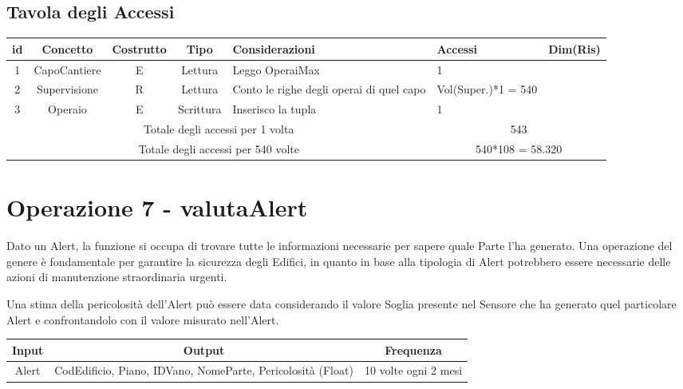 \documentclass[12pt,a4paper]{report}
\begin{document}
        \subsection{Tavola degli Accessi}
        \begin{tabular}{|c|c|c|c|p{4cm}|p{3cm}|c|}
            \hline
            \textbf{id} & \textbf{Concetto} & \textbf{Costrutto} & \textbf{Tipo} & \textbf{Considerazioni} & \textbf{Accessi} & \textbf{Dim(Ris)} \\ \hline
            1 & CapoCantiere & E & Lettura & Leggo OperaiMax & 1 & ~ \\ \hline
            2 & Supervisione & R & Lettura & Conto le righe degli operai di quel capo & Vol(Super.)*1 = 540 & ~ \\ \hline
            3 & Operaio & E & Scrittura & Inserisco la tupla & 1 & ~ \\ \hline
            \multicolumn{5}{|c|}{Totale degli accessi per 1 volta} & \multicolumn{2}{|c|}{543} \\ \hline
            \multicolumn{5}{|c|}{Totale degli accessi per 540 volte} & \multicolumn{2}{|c|}{540*108 = 58.320} \\ \hline
        \end{tabular}

        \section{Operazione 7 - valutaAlert}
            Dato un Alert, la funzione si occupa di trovare tutte le informazioni necessarie per sapere quale Parte l'ha generato. Una operazione del genere è fondamentale per garantire la sicurezza degli Edifici, in quanto in base alla tipologia di Alert potrebbero essere necessarie delle azioni di manutenzione straordinaria urgenti.

            Una stima della pericolosità dell'Alert può essere data considerando il valore Soglia presente nel Sensore che ha generato quel particolare Alert e confrontandolo con il valore misurato nell'Alert.

        \begin{center}
            \begin{tabular}{|c|c|c|}
                \hline
                \rowcolor{viola} \textbf{Input} & \textbf{Output} & \textbf{Frequenza} \\ \hline
                Alert & CodEdificio, Piano, IDVano, NomeParte, Pericolosità (Float) & 10 volte ogni 2 mesi \\ \hline
            \end{tabular}
        \end{center}
\end{document}

